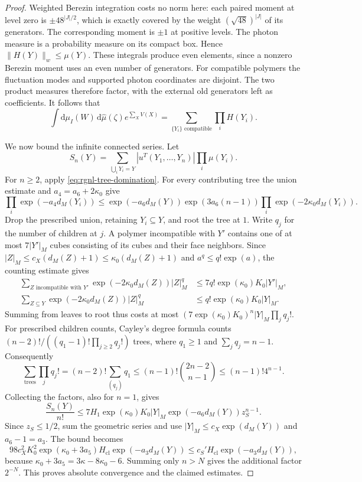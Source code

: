 \documentclass[11pt,letterpaper,reqno]{amsart}
\newcommand{\dd}{\mathrm d}
\begin{document}
\begin{proof}
Weighted Berezin integration costs no norm here:
each paired moment at level zero is
$\pm48^{|J|/2}$, which is exactly covered by the
weight $(\sqrt{48})^{|J|}$ of its generators.
The corresponding moment is $\pm1$ at positive levels.
The photon measure is a probability measure on its compact
box. Hence $\|H(Y)\|_w\le\mu(Y)$.
These integrals produce even elements, since a nonzero
Berezin moment uses an even number of generators.
For compatible polymers the fluctuation modes and
supported photon coordinates are disjoint. The two
product measures therefore factor, with the external
old generators left as coefficients. It follows that
\begin{equation}\label{eq:rgnl-compatible-partition}
 \int\dd\mu_I(W)\,\dd\widehat\mu(\zeta)e^{\sum_XV(X)}
             =\sum_{\{Y_i\}\text{ compatible}}\prod_iH(Y_i).
\end{equation}

We now bound the infinite connected series. Let
\[
 S_n(Y)=\sum_{\bigcup_iY_i=Y}
                   |u^T(Y_1,\ldots,Y_n)|\prod_i\mu(Y_i).
\]
For $n\ge2$, apply \eqref{eq:rgnl-tree-domination}.
For every contributing tree the union estimate and
$a_4=a_6+2\kappa_0$ give
\[
 \prod_i \exp(-a_4d_M(Y_i))
 \le \exp(-a_6d_M(Y))\exp(3a_6(n-1))
                                  \prod_i \exp(-2\kappa_0d_M(Y_i)).
\]
Drop the prescribed union, retaining $Y_i\subseteq Y$,
and root the tree at $1$. Write $q_j$ for the number
of children at $j$. A polymer incompatible with $Y'$
contains one of at most $7|Y'|_M$ cubes consisting of
its cubes and their face neighbors. Since
$|Z|_M\le c_X(d_M(Z)+1)\le\kappa_0(d_M(Z)+1)$ and
$a^q\le q!\exp(a)$, the counting estimate gives
\begin{align*}
 \sum_{Z\text{ incompatible with }Y'}
      \exp(-2\kappa_0d_M(Z))|Z|_M^{q}
            &\le7q!\exp(\kappa_0)K_0|Y'|_M,\\
 \sum_{Z\subseteq Y}\exp(-2\kappa_0d_M(Z))|Z|_M^q
            &\le q!\exp(\kappa_0)K_0|Y|_M.
\end{align*}
Summing from leaves to root thus costs at most
$(7\exp(\kappa_0)K_0)^n|Y|_M\prod_jq_j!$.
For prescribed children counts, Cayley's degree formula
\cite[Proposition~4]{PostnikovLin2019}
counts
$(n-2)!/((q_1-1)!\prod_{j\ge2}q_j!)$ trees, where
$q_1\ge1$ and $\sum_jq_j=n-1$.
Consequently
\[
 \sum_{\text{trees}}\prod_jq_j!
   =(n-2)!\sum_{(q_j)}q_1
   \le(n-1)!\binom{2n-2}{n-1}
   \le(n-1)!4^{n-1}.
\]
Collecting the factors, also for $n=1$, gives
\begin{equation}\label{eq:rgnl-connected-n-bound}
 \frac{S_n(Y)}{n!}
 \le7H_1\exp(\kappa_0)K_0|Y|_M
                                      \exp(-a_6d_M(Y))z_S^{n-1}.
\end{equation}
Since $z_S\le1/2$, sum the geometric series and use
$|Y|_M\le c_X\exp(d_M(Y))$ and $a_6-1=a_3$.
The bound becomes
\[
 98c_X^2K_0^2\exp(\kappa_0+3a_5)
                                 H_{\mathrm{cl}}\exp(-a_3d_M(Y))
 \le c_S'H_{\mathrm{cl}}\exp(-a_3d_M(Y)),
\]
because $\kappa_0+3a_5=3\kappa-8\kappa_0-6$.
Summing only $n>N$ gives the additional factor $2^{-N}$.
This proves absolute convergence and the claimed estimates.


\end{proof}
\end{document}
